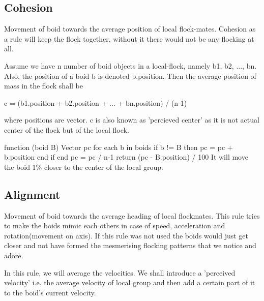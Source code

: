 \documentclass[12pt]{article}
\begin{document}
\subsection{Cohesion}

Movement of boid towards the average position of local flock-mates. Cohesion as a rule will keep the flock together, without it there would not be any flocking at all.\newline

Assume we have n number of boid objects in a local-flock, namely b1, b2, ..., bn. Also, the position of a boid b is denoted b.position. Then the average position of mass in the flock shall be\newline

	c = (b1.position + b2.position + ... + bn.position) / (n-1)\newline

where positions are vector. c is also known as 'percieved center' as it is not actual center of the flock but of the local flock.\newline

	function (boid B){\newline
		Vector pc\newline
		for each b in boids\newline
			if b != B then\newline
				pc = pc + b.position\newline
			end if\newline
		end\newline
		pc = pc / n-1\newline
		return (pc - B.position) / 100\newline
}
It will move the boid 1\% closer to the center of the local group.
\newpage

\subsection{Alignment}
Movement of boid towards the average heading of local flockmates. This rule tries to make
the boids mimic each others in case of speed, acceleration and rotation(movement on axis). If this rule was not used the boids
would just get closer and not have formed the mesmerising flocking patterns that we notice and adore. \newline

In this rule, we will average the velocities. We shall introduce a 'perceived velocity' i.e. the average velocity of local group and then add a certain part of it to the boid's current velocity.
\end{document}
